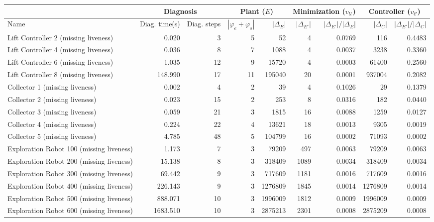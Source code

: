 \begin{tabular}{|l|rr|rr|rr|rr|}
  \hline & \multicolumn{2}{c|}{Diagnosis}&\multicolumn{2}{c|}{Plant ($E$)} & \multicolumn{2}{c|}{Minimization ($v_{\mathcal{U}}$)} & \multicolumn{2}{c|}{Controller ($v_{\mathcal{C}}$)}\\ \hline
Name & Diag. time(s) & Diag. steps & $|\varphi_e + \varphi_s|$ & $|\Delta_E|$ & $|\Delta_{E'}|$ & $|\Delta_{E'}|/|\Delta_{E}|$ & $|\Delta_{C}|$ & $|\Delta_{E'}|/|\Delta_{C}|$ \\ 
  \hline
Lift Controller 2 (missing liveness) & 0.020 & 3 & 5 & 52 & 4 & 0.0769 & 116 & 0.4483 \\ 
  Lift Controller 4 (missing liveness) & 0.036 & 8 & 7 & 1088 & 4 & 0.0037 & 3238 & 0.3360 \\ 
  Lift Controller 6 (missing liveness) & 1.035 & 12 & 9 & 15720 & 4 & 0.0003 & 61400 & 0.2560 \\ 
  Lift Controller 8 (missing liveness) & 148.990 & 17 & 11 & 195040 & 20 & 0.0001 & 937004 & 0.2082 \\ 
  Collector 1 (missing liveness) & 0.002 & 4 & 2 & 39 & 4 & 0.1026 & 29 & 0.1379 \\
  Collector 2 (missing liveness) & 0.023 & 15 & 2 & 253 & 8 & 0.0316 & 182 & 0.0440 \\ 
  Collector 3 (missing liveness) & 0.059 & 21 & 3 & 1815 & 16 & 0.0088 & 1259 & 0.0127 \\ 
  Collector 4 (missing liveness) & 0.224 & 22 & 4 & 13621 & 18 & 0.0013 & 9305 & 0.0019 \\ 
  Collector 5 (missing liveness) & 4.785 & 48 & 5 & 104799 & 16 & 0.0002 & 71093 & 0.0002 \\ 
  Exploration Robot 100 (missing liveness) & 1.173 & 7 & 3 & 79209 & 497 & 0.0063 & 79209 & 0.0063 \\ 
  Exploration Robot 200 (missing liveness) & 15.138 & 8 & 3 & 318409 & 1089 & 0.0034 & 318409 & 0.0034 \\ 
  Exploration Robot 300 (missing liveness) & 69.442 & 9 & 3 & 717609 & 1181 & 0.0016 & 717609 & 0.0016 \\ 
  Exploration Robot 400 (missing liveness) & 226.143 & 9 & 3 & 1276809 & 1845 & 0.0014 & 1276809 & 0.0014 \\ 
  Exploration Robot 500 (missing liveness) & 888.071 & 10 & 3 & 1996009 & 1812 & 0.0009 & 1996009 & 0.0009 \\ 
  Exploration Robot 600 (missing liveness) & 1683.510 & 10 & 3 & 2875213 & 2301 & 0.0008 & 2875209 & 0.0008 \\ 

\end{tabular}
